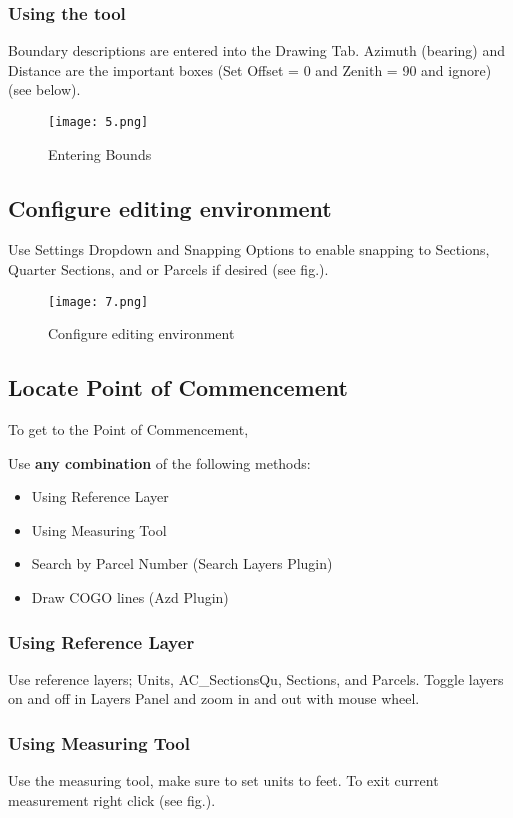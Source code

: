\documentclass{book}
\begin{document}
\subsubsection{Using the tool}
\large Boundary descriptions are entered into the Drawing Tab. Azimuth (bearing) and Distance are the important boxes (Set Offset = 0 and Zenith = 90 and ignore)(see below).
\begin{figure}[H]
\begin{center}
	\texttt{[image: 5.png]} 
	\end{center}
	\caption{Entering Bounds}
\end{figure}
\pagebreak

\subsection{Configure editing environment}
\large Use Settings Dropdown and Snapping Options to enable snapping to Sections, Quarter Sections, and or Parcels if desired (see fig.).

\begin{figure}[H]
\begin{center}
	\texttt{[image: 7.png]} 
	\end{center}
	\caption{Configure editing environment}
\end{figure}
\pagebreak

\subsection{Locate Point of Commencement}
To get to the Point of Commencement,
\medskip

Use \textbf{any combination} of the following methods:
\begin{itemize}
	\item{Using Reference Layer}
	\item{Using Measuring Tool}
	\item{Search by Parcel Number \small(Search Layers Plugin)}
	\item{Draw COGO lines \small(Azd Plugin)}
\end{itemize}

\subsubsection{Using Reference Layer}

{\large Use reference layers; Units, AC\_SectionsQu, Sections, and Parcels.  Toggle layers on and off in Layers Panel and zoom in and out with mouse wheel.}
\pagebreak

\subsubsection{Using Measuring Tool}
\large Use the measuring tool, make sure to set units to feet.  To exit current measurement right click (see fig.).
\end{document}
